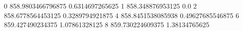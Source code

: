 0 858.9803466796875 0.6314697265625
1 858.348876953125 0.0
2 858.6778564453125 0.3289794921875
4 858.8451538085938 0.49627685546875
6 859.427490234375 1.07861328125
8 859.730224609375 1.38134765625
